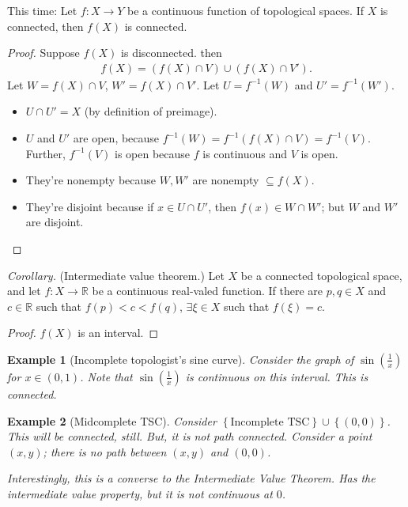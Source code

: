 \documentclass[12pt]{article}
\newtheorem*{example}{Example}
\newcommand{\RR}{\mathbb{R}}
\begin{document}
This time: Let $f: X \to Y$ be a continuous function of topological spaces.  If $X$ is connected, then $f(X)$ is connected.

\begin{proof}
  Suppose $f(X)$ is disconnected.  then
  \begin{align*}
    f(X) = (f(X) \cap V) \cup (f(X) \cap V').
  \end{align*}
  Let $W = f(X) \cap V$, $W' = f(X) \cap V'$.  Let $U = f^{-1}(W)$ and $U' = f^{-1}(W')$.

  \begin{itemize}
    \item $U \cap U' = X$ (by definition of preimage).
    \item $U$ and $U'$ are open, because $f^{-1}(W) = f^{-1}(f(X) \cap V) = f^{-1}(V)$.  Further, $f^{-1}(V)$ is open because $f$ is continuous and $V$ is open.
    \item They're nonempty because $W, W'$ are nonempty $\subseteq f(X)$.
    \item They're disjoint because if $x \in U \cap U'$, then $f(x) \in W \cap W'$; but $W$ and $W'$ are disjoint.
  \end{itemize}
\end{proof}

{\it Corollary.} (Intermediate value theorem.)  Let $X$ be a connected topological space, and let $f: X \to \RR$ be a continuous real-valed function.  If there are $p, q \in X$ and $c \in \RR$ such that $f(p) < c  < f(q)$, $\exists \xi \in X$ such that $f(\xi) = c$.

\begin{proof}
  $f(X)$ is an interval.
\end{proof}

\begin{example}[Incomplete topologist's sine curve] 
  Consider the graph of $\sin \left( \frac{1}{x} \right)$ for $x \in \left( 0, 1 \right)$.  Note that $\sin \left( \frac{1}{x} \right)$ is continuous on this interval.  This is connected.
\end{example}

\begin{example}[Midcomplete TSC] 
  Consider $\left\{ \text{Incomplete TSC} \right\} \cup \left\{ (0, 0) \right\}$.  This will be connected, still.  But, it is not path connected.  Consider a point $(x, y)$; there is no path between $(x, y)$ and $(0, 0)$.

  Interestingly, this is a converse to the Intermediate Value Theorem.  Has the intermediate value property, but it is not continuous at $0$.
\end{example}
\end{document}
